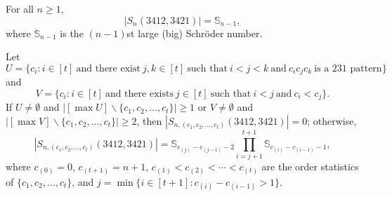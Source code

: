 \documentclass[10pt,a4paper]{amsart}
\begin{document}
\begin{theorem}\label{Theorem:34123421}

For all $n\geq1$,
\[
|S_n(3412,3421)|=\mathbb{S}_{n-1},
\]
where $\mathbb{S}_{n-1}$ is the $(n-1)$st large (big) Schr\"{o}der number.
\end{theorem}

\begin{theorem}
    Let
    \[
    U=\{c_i:i\in[t]~\text{and there exist}~j,k\in[t]~\text{such that}~i<j<k~\text{and}~c_ic_jc_k~\text{is a 231 pattern}\}
    \]
    and
    \[
    V=\{c_i:i\in[t]~\text{and there exists}~j\in[t]~\text{such that}~i<j~\text{and}~c_i<c_j\}.
    \]
    If $U\neq\emptyset$ and $\left|[\max U]\backslash\{c_1,c_2,\ldots,c_t\}\right|\geq1$ or $V\neq\emptyset$ and $\left|[\max V]\backslash\{c_1,c_2,\ldots,c_t\}\right|\geq2$, then $|S_{n,(c_1,c_2,\ldots,c_t)}(3412,3421)|=0$; otherwise,
\[
|S_{n,(c_1,c_2,\ldots,c_t)}(3412,3421)|=\mathbb{S}_{c_{(j)}-c_{(j-1)}-2}\prod_{i=j+1}^{t+1}\mathbb{S}_{c_{(i)}-c_{(i-1)}-1},
\]
where $c_{(0)}=0$, $c_{(t+1)}=n+1$, $c_{(1)}<c_{(2)}<\cdots<c_{(t)}$ are the order statistics of $\{c_1,c_2,\ldots,c_t\}$, and $j=\min\{i\in[t+1]:c_{(i)}-c_{(i-1)}>1\}$.
\end{theorem}
\end{document}
